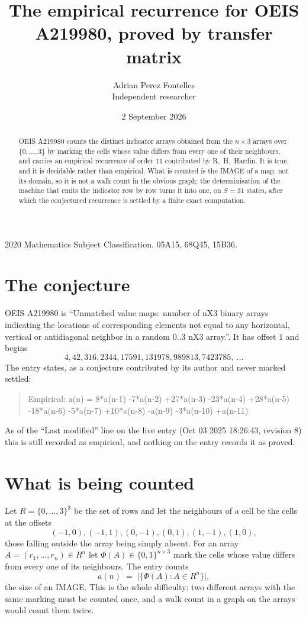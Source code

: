 \documentclass[11pt,a4paper]{article}
\title{The empirical recurrence for OEIS A219980, proved by transfer matrix}
\author{Adrian Perez Fontelles\\ \small Independent researcher}
\date{2 September 2026}
\theoremstyle{plain}
\theoremstyle{definition}
\begin{document}
\maketitle

\begin{abstract}
OEIS A219980 counts the distinct indicator arrays obtained from the $n\times3$ arrays over
$\{0,\dots,3\}$ by marking the cells whose value differs from every one of their neighbours, and carries an
empirical recurrence of order $11$ contributed by R.~H.~Hardin. It is true, and it is
decidable rather than empirical. What is counted is the IMAGE of a map, not its domain, so it
is not a walk count in the obvious graph; the determinisation of the machine that emits the
indicator row by row turns it into one, on $S=31$ states, after which the conjectured
recurrence is settled by a finite exact computation.
\end{abstract}

\noindent\small 2020 Mathematics Subject Classification. 05A15, 68Q45, 15B36.\normalsize

\section{The conjecture}

OEIS A219980 is ``Unmatched value maps: number of nX3 binary arrays indicating the locations of corresponding elements not equal to any horizontal, vertical or antidiagonal neighbor in a random 0..3 nX3 array.''. It has offset $1$ and begins
\[
4, 42, 316, 2344, 17591, 131978, 989813, 7423785,\ \dots
\]
The entry states, as a conjecture contributed by its author and never marked settled:
\begin{quote}
Empirical: a(n) = 8*a(n-1) -7*a(n-2) +27*a(n-3) -23*a(n-4) +28*a(n-5) -18*a(n-6) -5*a(n-7) +10*a(n-8) -a(n-9) -3*a(n-10) +a(n-11)
\end{quote}
As of the ``Last modified'' line on the live entry (Oct 03 2025 18:26:43, revision 8) this is still
recorded as empirical, and nothing on the entry records it as proved.

\section{What is being counted}

Let $R=\{0,\dots,3\}^{3}$ be the set of rows and let the neighbours of a cell be the
cells at the offsets
\[
(-1,0), (-1,1), (0,-1), (0,1), (1,-1), (1,0),
\]
those falling outside the array being simply absent. For an array
$A=(r_1,\dots,r_n)\in R^n$ let $\Phi(A)\in\{0,1\}^{n\times3}$ mark the cells whose value
differs from every one of its neighbours. The entry counts
\[
a(n)\;=\;\bigl|\{\Phi(A):A\in R^n\}\bigr| ,
\]
the size of an IMAGE. This is the whole difficulty: two different arrays with the same marking
must be counted once, and a walk count in a graph on the arrays would count them twice.
\end{document}

